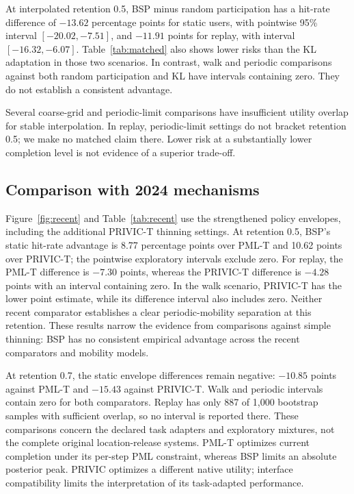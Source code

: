 \documentclass[review,12pt]{elsarticle}
\begin{document}
At interpolated retention 0.5, BSP minus random participation has a hit-rate difference of $-13.62$ percentage points for static users, with pointwise 95\% interval $[-20.02,-7.51]$, and $-11.91$ points for replay, with interval $[-16.32,-6.07]$. Table~\ref{tab:matched} also shows lower risks than the KL adaptation in those two scenarios. In contrast, walk and periodic comparisons against both random participation and KL have intervals containing zero. They do not establish a consistent advantage.

Several coarse-grid and periodic-limit comparisons have insufficient utility overlap for stable interpolation. In replay, periodic-limit settings do not bracket retention 0.5; we make no matched claim there. Lower risk at a substantially lower completion level is not evidence of a superior trade-off.

\begin{table}[tbp]
\centering\small
\caption{Exploratory interpolation at retention 0.5. Hit rates and differences are in percentage points. Paired cluster-bootstrap intervals are pointwise. All displayed comparisons have 1,000 valid overlapping resamples.}
\label{tab:matched}
\end{table}

\subsection{Comparison with 2024 mechanisms}
Figure~\ref{fig:recent} and Table~\ref{tab:recent} use the strengthened policy envelopes, including the additional PRIVIC-T thinning settings. At retention 0.5, BSP's static hit-rate advantage is 8.77 percentage points over PML-T and 10.62 points over PRIVIC-T; the pointwise exploratory intervals exclude zero. For replay, the PML-T difference is $-7.30$ points, whereas the PRIVIC-T difference is $-4.28$ points with an interval containing zero. In the walk scenario, PRIVIC-T has the lower point estimate, while its difference interval also includes zero. Neither recent comparator establishes a clear periodic-mobility separation at this retention. These results narrow the evidence from comparisons against simple thinning: BSP has no consistent empirical advantage across the recent comparators and mobility models.

At retention 0.7, the static envelope differences remain negative: $-10.85$ points against PML-T and $-15.43$ against PRIVIC-T. Walk and periodic intervals contain zero for both comparators. Replay has only 887 of 1,000 bootstrap samples with sufficient overlap, so no interval is reported there. These comparisons concern the declared task adapters and exploratory mixtures, not the complete original location-release systems. PML-T optimizes current completion under its per-step PML constraint, whereas BSP limits an absolute posterior peak. PRIVIC optimizes a different native utility; interface compatibility limits the interpretation of its task-adapted performance.
\end{document}
